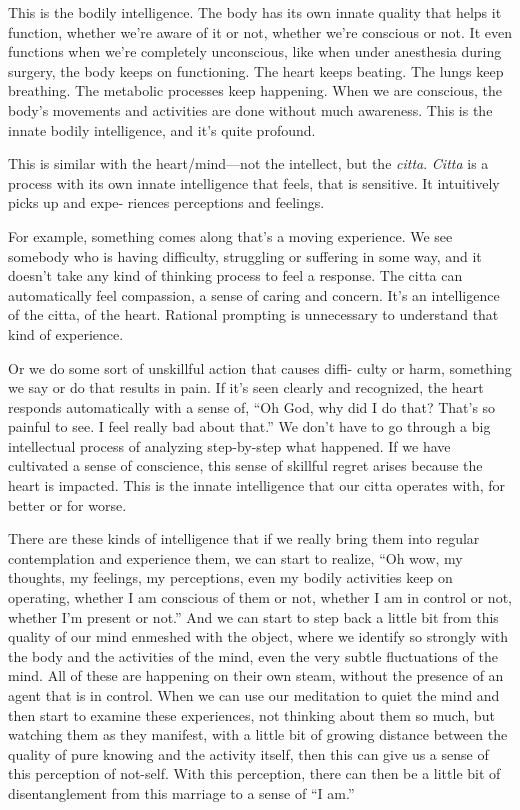 \enlargethispage{1\baselineskip}
This is the bodily intelligence. The body has its own innate quality that helps it function, whether we're aware of it or not, whether we're conscious or not. It even functions when we're completely unconscious, like when under anesthesia during surgery, the body keeps on functioning. The heart keeps beating. The lungs keep breathing. The metabolic processes keep happening. When we are conscious, the body's movements and activities are done without much awareness. This is the innate bodily intelligence, and it's quite profound.

This is similar with the heart/mind---not the intellect, but the \emph{citta}. \emph{Citta} is a process with its own innate intelligence that feels, that is sensitive. It intuitively picks up and expe- \linebreak riences perceptions and feelings.

For example, something comes along that's a moving experience. We see somebody who is having difficulty, struggling or suffering in some way, and it doesn't take any kind of thinking process to feel a response. The citta can automatically feel compassion, a sense of caring and concern. It's an intelligence of the citta, of the heart. Rational prompting is unnecessary to understand that kind of experience.

\enlargethispage{1\baselineskip}
Or we do some sort of unskillful action that causes diffi- \linebreak culty or harm, something we say or do that results in pain. If it's seen clearly and recognized, the heart responds automatically with a sense of, ``Oh God, why did I do that? That's so painful to see. I feel really bad about that.'' We don't have to go through a big intellectual process of analyzing step-by-step what happened. If we have cultivated a sense of conscience, this sense of skillful regret arises because the heart is impacted. This is the innate intelligence that our citta operates with, for better or for worse.

There are these kinds of intelligence that if we really bring them into regular contemplation and experience them, we can start to realize, ``Oh wow, my thoughts, my feelings, my perceptions, even my bodily activities keep on operating, whether I am conscious of them or not, whether I am in control or not, whether I'm present or not.'' And we can start to step back a little bit from this quality of our mind enmeshed with the object, where we identify so strongly with the body and the activities of the mind, even the very subtle fluctuations of the mind. All of these are happening on their own steam, without the presence of an agent that is in control. When we can use our meditation to quiet the mind and then start to examine these experiences, not thinking about them so much, but watching them as they manifest, with a little bit of growing distance between the quality of pure knowing and the activity itself, then this can give us a sense of this perception of not-self. With this perception, there can then be a little bit of disentanglement from this marriage to a sense of ``I am.''

